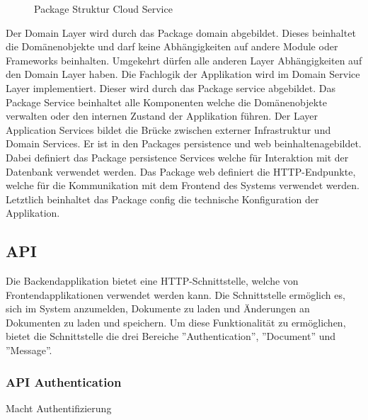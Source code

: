 \begin{figure}[h]
    \centering
    \begin{minipage}[b]{0.9\textwidth}
        \caption{Package Struktur Cloud Service}\label{fig:packagescloudservice}
    \end{minipage}
\end{figure}

Der Domain Layer wird durch das Package domain abgebildet.
Dieses beinhaltet die Domänenobjekte und darf keine Abhängigkeiten auf andere Module oder Frameworks beinhalten.
Umgekehrt dürfen alle anderen Layer Abhängigkeiten auf den Domain Layer haben.
Die Fachlogik der Applikation wird im Domain Service Layer implementiert.
Dieser wird durch das Package service abgebildet.
Das Package Service beinhaltet alle Komponenten welche die Domänenobjekte verwalten oder den internen Zustand der Applikation führen.
Der Layer Application Services bildet die Brücke zwischen externer Infrastruktur und Domain Services.
Er ist in den Packages persistence und web beinhaltenagebildet.
Dabei definiert das Package persistence Services welche für Interaktion mit der Datenbank verwendet werden.
Das Package web definiert die HTTP-Endpunkte, welche für die Kommunikation mit dem Frontend des Systems verwendet werden.
Letztlich beinhaltet das Package config die technische Konfiguration der Applikation.

\clearpage

\subsection{API}

Die Backendapplikation bietet eine HTTP-Schnittstelle, welche von Frontendapplikationen verwendet werden kann.
Die Schnittstelle ermöglich es, sich im System anzumelden, Dokumente zu laden und Änderungen an Dokumenten zu laden und speichern.
Um diese Funktionalität zu ermöglichen, bietet die Schnittstelle die drei Bereiche ''Authentication'', ''Document'' und ''Message''.

\subsubsection{API Authentication}

Macht Authentifizierung

